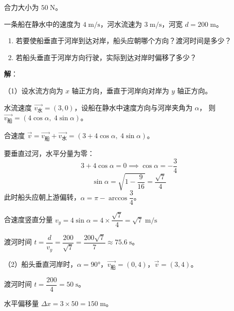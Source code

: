 \documentclass[12pt, a4paper]{ctexart}
\begin{document}
合力大小为 $50\;\text{N}$。

\begin{appbox}[【应用2】船过河问题]
一条船在静水中的速度为 $4\;\text{m/s}$，河水流速为 $3\;\text{m/s}$，河宽 $d=200\;\text{m}$。
\begin{enumerate}[label=(\arabic*)]
  \item 若要使船垂直于河岸到达对岸，船头应朝哪个方向？渡河时间是多少？
  \item 若船头垂直于河岸方向行驶，实际到达对岸时偏移了多少？
\end{enumerate}
\end{appbox}

\textbf{解}：

（1）设水流方向为 $x$ 轴正方向，垂直于河岸向对岸为 $y$ 轴正方向。

水流速度 $\vec{v_水}=(3,0)$，设船在静水中速度方向与河岸夹角为 $\alpha$，
则 $\vec{v_船}=(4\cos\alpha,\; 4\sin\alpha)$。

合速度 $\vec{v}=\vec{v_船}+\vec{v_水}=(3+4\cos\alpha,\; 4\sin\alpha)$。

要垂直过河，水平分量为零：
\[
3 + 4\cos\alpha = 0 \implies \cos\alpha = -\frac{3}{4}
\]
\[
\sin\alpha = \sqrt{1-\frac{9}{16}} = \frac{\sqrt{7}}{4}
\]
此时船头应朝上游偏转，$\alpha = \pi - \arccos\dfrac{3}{4}$。

合速度竖直分量 $v_y = 4\sin\alpha = 4 \times \dfrac{\sqrt{7}}{4} = \sqrt{7}\;\text{m/s}$

渡河时间 $t = \dfrac{d}{v_y} = \dfrac{200}{\sqrt{7}} = \dfrac{200\sqrt{7}}{7} \approx 75.6\;\text{s}$。

（2）船头垂直河岸时，$\alpha=90°$，$\vec{v_船}=(0,4)$，$\vec{v}=(3,4)$。

渡河时间 $t = \dfrac{200}{4} = 50\;\text{s}$。

水平偏移量 $\Delta x = 3 \times 50 = 150\;\text{m}$。

\begin{center}
\end{center}
\end{document}
